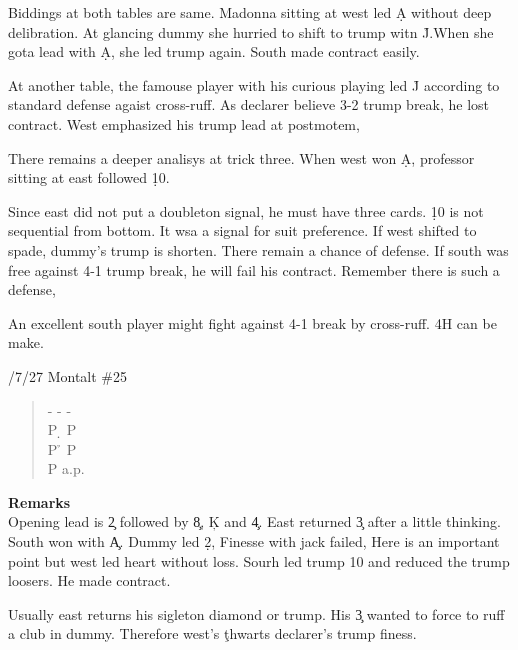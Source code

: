 Biddings at both tables are same. Madonna sitting at west
led \d A without deep delibration. At glancing dummy she hurried to
shift to trump witn \h J.When she gota lead with \d A, she led
trump again. South made contract easily.

At another table, the famouse player with his curious playing
led \h J according to standard defense agaist cross-ruff.
As declarer believe 3-2 trump break, he lost contract.
West emphasized his trump lead at postmotem,

There remains a deeper analisys at trick three. When west won
\d A, professor sitting at east followed \d 10.

Since east did not put a doubleton signal, he must have
three cards. \d 10 is not sequential from bottom. It wsa a
signal for suit preference. If west shifted to spade, dummy's trump
is shorten. There remain a chance of defense. If south was free
against 4-1 trump break, he will fail his contract.
Remember there is such a defense,

An excellent south player might fight against 4-1 break
by cross-ruff. 4H can be make. 

\vspace{0.5cm}
/7/27 Montalt \#25
\begin{quote}
%
  {}%
  {}
  {}%
  {}%
\end{quote}
\begin{quote}
\begin{bidding}
- \> -  \> - \s  \\
P \d \> P  \s \\
P \h \> P \s \\
P \s \> a.p.
\end{bidding}
\end{quote}
{\bf Remarks}\\

Opening lead is \c 2 followed by \c 8, \c K and \c 4.
East returned \c 3 after a little thinking. South won with \c A.
Dummy led \d 2, Finesse with jack failed, Here is an important
point but west led heart without loss. Sourh led trump 10 and
reduced the trump loosers. He made contract.

Usually east returns his sigleton diamond or trump. His \c 3
wanted to force to ruff a club in dummy. Therefore west's
\c thwarts declarer's trump finess.





